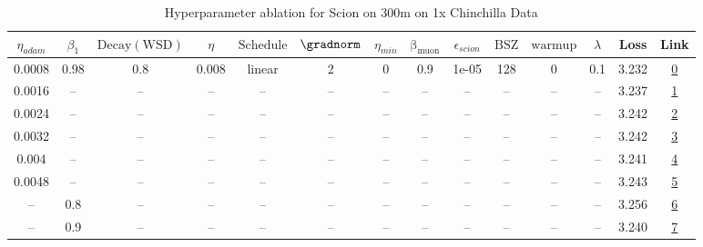 \begin{table}[H]
\centering
\caption{Hyperparameter ablation for Scion on 300m on 1x Chinchilla Data}
\label{tab:ablation_scion_300m_on_1x_chinchilla_data}
\begin{tabular}{cccccccccccccc}
\toprule
$\eta_{adam}$ & $\beta_1$ & $\mathrm{Decay (WSD)}$ & $\eta$ & $\mathrm{Schedule}$ & $\gradnorm$ & $\eta_{min}$ & $\mathrm{\beta_{muon}}$ & $\epsilon_{scion}$ & $\mathrm{BSZ}$ & $\mathrm{warmup}$ & $\lambda$ & Loss & Link \\
\midrule
0.0008 & 0.98 & 0.8 & 0.008 & linear & 2 & 0 & 0.9 & 1e-05 & 128 & 0 & 0.1 & 3.232 & \href{https://wandb.ai/stanford-mercury/optimizer-scaling/runs/sweep-300m-6B-sciond108279lr0.008-wd0.1-minlr0-warmup0-b10.98-gn-99a9f4}{0} \\
\midrule
0.0016 & -- & -- & -- & -- & -- & -- & -- & -- & -- & -- & -- & 3.237 & \href{https://wandb.ai/stanford-mercury/optimizer-scaling/runs/sweep-300m-6B-scionfa9d01lr0.008-wd0.1-minlr0-warmup0-b10.98-gn2-d33d38}{1} \\
0.0024 & -- & -- & -- & -- & -- & -- & -- & -- & -- & -- & -- & 3.242 & \href{https://wandb.ai/stanford-mercury/optimizer-scaling/runs/sweep-300m-6B-sciond6c4a32lr0.008-wd0.1-minlr0-warmup0-b10.98-gn-c70e3a}{2} \\
0.0032 & -- & -- & -- & -- & -- & -- & -- & -- & -- & -- & -- & 3.242 & \href{https://wandb.ai/stanford-mercury/optimizer-scaling/runs/sweep-300m-6B-sciond4688b4lr0.008-wd0.1-minlr0-warmup0-b10.98-gn-cc3a61}{3} \\
0.004 & -- & -- & -- & -- & -- & -- & -- & -- & -- & -- & -- & 3.241 & \href{https://wandb.ai/stanford-mercury/optimizer-scaling/runs/sweep-300m-6B-sciond8d54b4lr0.008-wd0.1-minlr0-warmup0-b10.98-gn-e2040c}{4} \\
0.0048 & -- & -- & -- & -- & -- & -- & -- & -- & -- & -- & -- & 3.243 & \href{https://wandb.ai/stanford-mercury/optimizer-scaling/runs/sweep-300m-6B-scionda31eablr0.008-wd0.1-minlr0-warmup0-b10.98-gn-ed268b}{5} \\
-- & 0.8 & -- & -- & -- & -- & -- & -- & -- & -- & -- & -- & 3.256 & \href{https://wandb.ai/stanford-mercury/optimizer-scaling/runs/sweep-300m-6B-sciond3c2ebclr0.008-wd0.1-minlr0-warmup0-b10.8-gn2-8c6e43}{6} \\
-- & 0.9 & -- & -- & -- & -- & -- & -- & -- & -- & -- & -- & 3.240 & \href{https://wandb.ai/stanford-mercury/optimizer-scaling/runs/sweep-300m-6B-sciond8d2973lr0.008-wd0.1-minlr0-warmup0-b10.9-gn2-1189a9}{7} \\

\end{tabular}
\end{table}
